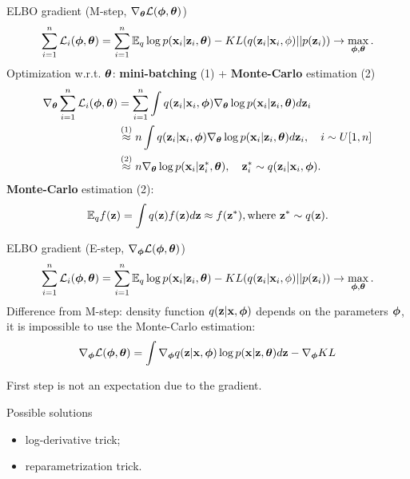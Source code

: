 \begin{frame}{ELBO gradient (M-step, $\nabla_{\boldsymbol{\theta}} \mathcal{L}(\boldsymbol{\phi}, \boldsymbol{\theta})$)}
	\vspace{-0.3cm}
	\[
		\sum_{i=1}^n \mathcal{L}_i (\boldsymbol{\phi}, \boldsymbol{\theta})  = \sum_{i=1}^n \mathbb{E}_{q} \log p(\mathbf{x}_i | \mathbf{z}_i, \boldsymbol{\theta}) - KL (q(\mathbf{z}_i| \mathbf{x}_i, \phi) || p(\mathbf{z}_i)) \rightarrow \max_{\boldsymbol{\phi}, \boldsymbol{\theta}}.
	\]
	Optimization w.r.t. $\boldsymbol{\theta}$: \textbf{mini-batching} (1) + \textbf{Monte-Carlo} estimation (2)
	\begin{align*}
		\nabla_{\boldsymbol{\theta}} \sum_{i=1}^n \mathcal{L}_i (\boldsymbol{\phi}, \boldsymbol{\theta})
		&= \sum_{i=1}^n \int q(\mathbf{z}_i|\mathbf{x}_i, \boldsymbol{\phi}) \nabla_{\boldsymbol{\theta}}\log p(\mathbf{x}_i|\mathbf{z}_i, \boldsymbol{\theta})  d \mathbf{z}_i \\
		&\mathrel{\stackrel{\rm (1)}\approx} n\int q(\mathbf{z}_i|\mathbf{x}_i, \boldsymbol{\phi}) \nabla_{\boldsymbol{\theta}}\log p(\mathbf{x}_i|\mathbf{z}_i, \boldsymbol{\theta}) d \mathbf{z}_i , \quad i \sim U[1, n] \\
		&\mathrel{\stackrel{\rm (2)}\approx}  n \nabla_{\boldsymbol{\theta}}\log p(\mathbf{x}_i|\mathbf{z}^*_i, \boldsymbol{\theta}), \quad \mathbf{z}^*_i \sim q(\mathbf{z}_i|\mathbf{x}_i, \boldsymbol{\phi}).
	\end{align*}
	\textbf{Monte-Carlo} estimation (2):
	\[
		\mathbb{E}_q f(\mathbf{z}) = \int q(\mathbf{z}) f(\mathbf{z}) d\mathbf{z} \approx f(\mathbf{z}^*), \text{where } \mathbf{z}^* \sim q(\mathbf{z}).
	\]
	\end{frame}
\begin{frame}{ELBO gradient (E-step, $\nabla_{\boldsymbol{\phi}} \mathcal{L}(\boldsymbol{\phi}, \boldsymbol{\theta})$)}
	\vspace{-0.3cm}
	\[
	\sum_{i=1}^n \mathcal{L}_i (\boldsymbol{\phi}, \boldsymbol{\theta})  = \sum_{i=1}^n \mathbb{E}_{q} \log p(\mathbf{x}_i | \mathbf{z}_i, \boldsymbol{\theta}) - KL (q(\mathbf{z}_i| \mathbf{x}_i, \phi) || p(\mathbf{z}_i)) \rightarrow \max_{\boldsymbol{\phi}, \boldsymbol{\theta}}.
	\]
	Difference from M-step: density function $q(\mathbf{z}| \mathbf{x}, \boldsymbol{\phi})$ depends on the parameters $\boldsymbol{\phi}$, it is impossible to use the Monte-Carlo estimation:
	\[
	\nabla_{\boldsymbol{\phi}} \mathcal{L} (\boldsymbol{\phi}, \boldsymbol{\theta}) = \int \nabla_{\boldsymbol{\phi}} q(\mathbf{z}| \mathbf{x}, \boldsymbol{\phi}) \log p(\mathbf{x} |\mathbf{z}, \boldsymbol{\theta}) d\mathbf{z} - \nabla_{\boldsymbol{\phi}} KL
	\]
	
	First step is not an expectation due to the gradient.
	
	\begin{block}{Possible solutions}
		\begin{itemize}
			\item log-derivative trick;
			\item reparametrization trick.
		\end{itemize}
	\end{block}
\end{frame}

